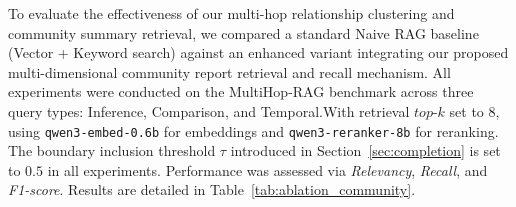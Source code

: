 \documentclass[11pt]{article}
\begin{document}
To evaluate the effectiveness of our multi-hop relationship clustering and community summary retrieval, we compared a standard Naive RAG baseline (Vector + Keyword search) against an enhanced variant integrating our proposed multi-dimensional community report retrieval and recall mechanism. All experiments were conducted on the MultiHop-RAG benchmark across three query types: Inference, Comparison, and Temporal.With retrieval $top\text{-}k$ set to 8, using \texttt{qwen3-embed-0.6b} for embeddings and \texttt{qwen3-reranker-8b} for reranking. The boundary inclusion threshold $\tau$ introduced in Section~\ref{sec:completion} is set to $0.5$ in all experiments. Performance was assessed via \textit{Relevancy}, \textit{Recall}, and \textit{F1-score}. Results are detailed in Table~\ref{tab:ablation_community}.

\begin{table}[H]
    \centering
    \caption{Ablation Study Results: Multi-dimensional Community Strategy}
    \label{tab:ablation_community}
    \setlength{\tabcolsep}{3pt}
    \small
\end{table}
\end{document}

